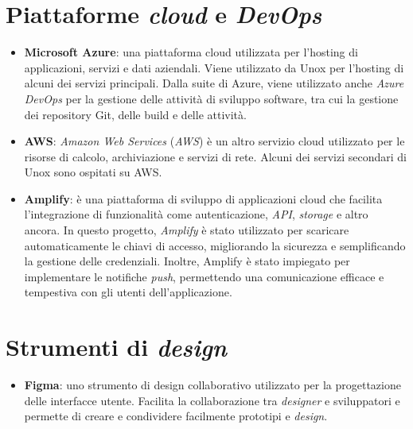\section{Piattaforme \textit{cloud} e \textit{DevOps}}
\begin{itemize}
\item \textbf{Microsoft Azure}: una piattaforma cloud utilizzata per l'hosting di applicazioni, servizi e dati aziendali. Viene utilizzato da Unox per l'hosting di alcuni dei servizi principali. Dalla suite di Azure, viene utilizzato anche \textit{Azure DevOps} per la gestione delle attività di sviluppo software, tra cui la gestione dei repository Git, delle build e delle attività.
\item \textbf{AWS}: \textit{Amazon Web Services} (\textit{AWS}) è un altro servizio cloud utilizzato per le risorse di calcolo, archiviazione e servizi di rete. Alcuni dei servizi secondari di Unox sono ospitati su AWS.
\item \textbf{Amplify}: è una piattaforma di sviluppo di applicazioni cloud che facilita l'integrazione di funzionalità come autenticazione, \textit{API}, \textit{storage} e altro ancora.
In questo progetto, \textit{Amplify} è stato utilizzato per scaricare automaticamente le chiavi di accesso, migliorando la sicurezza e semplificando la gestione delle credenziali.
Inoltre, Amplify è stato impiegato per implementare le notifiche \textit{push}, permettendo una comunicazione efficace e tempestiva con gli utenti dell'applicazione.
\end{itemize}

\section{Strumenti di \textit{design}}
\begin{itemize}
\item \textbf{Figma}: uno strumento di design collaborativo utilizzato per la progettazione delle interfacce utente. Facilita la collaborazione tra \textit{designer} e sviluppatori e permette di creare e condividere facilmente prototipi e \textit{design}.
\end{itemize}


\newpage
